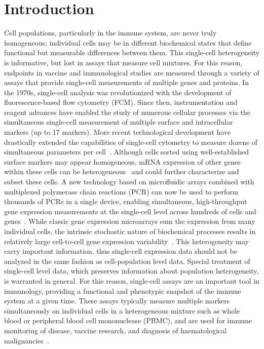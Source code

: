 \documentclass[useAMS,referee,usenatbib]{biom}
\begin{document}
\maketitle

\section{Introduction}
\label{s:intro}
Cell populations, particularly in the immune system, are never truly homogeneous; individual cells may be in different biochemical states that define functional but measurable differences between them. 
This single-cell heterogeneity is informative, but lost in assays that measure cell mixtures. 
For this reason, endpoints in vaccine and immunological studies are measured through a variety of assays that provide single-cell measurements of multiple genes and proteins. 
In the 1970s, single-cell analysis was revolutionized with the development of fluorescence-based flow cytometry (FCM). 
Since then, instrumentation and reagent advances have enabled the study of numerous cellular processes via the simultaneous single-cell measurement of multiple surface and intracellular markers (up to 17 markers). 
More recent technological development have drastically extended the capabilities of single-cell cytometry to measure dozens of simultaneous parameters per cell~\citep{Bendall:2011wf}. 
Although cells sorted using well-established surface markers may appear homogeneous, mRNA expression of other genes within these cells can be heterogeneous~\citep{Narsinh:2011gn, Flatz:2011jb} and could further characterize and subset these cells. 
A new technology based on microfluidic arrays combined with multiplexed polymerase chain reactions (PCR) can now be used to perform thousands of PCRs in a single device, enabling simultaneous, high-throughput gene expression measurements at the single-cell level across hundreds of cells and genes~\citep{Pieprzyk:2009uc}. 
While classic gene expression microarrays sum the expression from many individual cells, the intrinsic stochastic nature of biochemical processes results in relatively large cell-to-cell gene expression variability~\citep{vanOudenaarden200915a}. 
This heterogeneity may carry important information, thus single-cell expression data should not be analyzed in the same fashion as cell-population level data. 
Special treatment of single-cell level data, which preserves information about population heterogeneity, is warranted in general. 
For this reason, single-cell assays are an important tool in immunology, providing a functional and phenotypic snapshot of the immune system at a given time. 
These assays typically measure multiple markers simultaneously on individual cells in a heterogeneous mixture such as whole blood or peripheral blood cell mononuclease (PBMC), and are used for immune monitoring of disease, vaccine research, and diagnosis of haematological malignancies~\citep{Altman:1996wf,Betts:2006dw,Inokuma:2007tn}.
\end{document}
